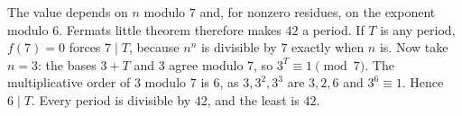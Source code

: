 The value depends on $n$ modulo $7$ and, for nonzero residues, on the exponent modulo $6$. Fermat\textquotesingle s little theorem therefore makes $42$ a period. If $T$ is any period, $f(7)=0$ forces $7\mid T$, because $n^n$ is divisible by $7$ exactly when $n$ is. Now take $n=3$: the bases $3+T$ and $3$ agree modulo $7$, so $3^T\equiv1\pmod7$. The multiplicative order of $3$ modulo $7$ is $6$, as $3,3^2,3^3$ are $3,2,6$ and $3^6\equiv1$. Hence $6\mid T$. Every period is divisible by $42$, and the least is $\boxed{42}$.
